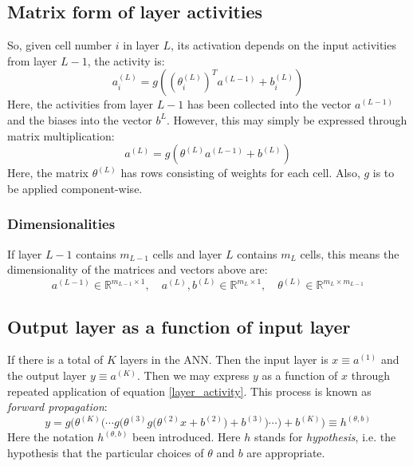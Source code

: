 \documentclass[12pt, a4paper]{article}
\numberwithin{equation}{section}
\begin{document}
\subsection{Matrix form of layer activities}
So, given cell number $i$ in layer $L$, its activation depends on the input activities from layer $L-1$, the activity is:
\begin{equation}
\label{layer_activity}
a^{(L)}_i=g\left(\left(\theta^{(L)}_i\right)^T a^{(L-1)} + b_i^{(L)}\right)
\end{equation}
Here, the activities from layer $L-1$ has been collected into the vector $a^{(L-1)}$ and the biases into the vector $b^{L}$. However, this may simply be expressed through matrix multiplication:
\begin{equation}
a^{(L)}=g\left(\theta^{(L)}a^{(L-1)}+b^{(L)}\right)
\end{equation}
Here, the matrix $\theta^{(L)}$ has rows consisting of weights for each cell. Also, $g$ is to be applied component-wise.

\subsubsection{Dimensionalities}
If layer $L-1$ contains $m_{L-1}$ cells and layer $L$ contains $m_L$ cells, this means the dimensionality of the matrices and vectors above are:
\begin{equation}
a^{(L-1)}\in\mathbb{R}^{m_{L-1}\times 1},\quad a^{(L)}, b^{(L)}\in\mathbb{R}^{m_L\times 1},\quad\theta^{(L)}\in\mathbb{R}^{m_L\times m_{L-1}} 
\end{equation}

\subsection{Output layer as a function of input layer}
If there is a total of $K$ layers in the ANN. Then the input layer is $x\equiv a^{(1)}$ and the output layer $y\equiv a^{(K)}$. Then we may express $y$ as a function of $x$ through repeated application of equation \ref{layer_activity}. This process is known as \textit{forward propagation}:
\begin{equation}
\label{hypothesis}
y=g\Bigg(\theta^{(K)}\bigg(\cdots g\Big(\theta^{(3)} g\big(\theta^{(2)}x+b^{(2)}\big)+b^{(3)}\Big)\cdots\bigg)+b^{(K)}\Bigg)\equiv h^{(\theta,b)}
\end{equation}
Here the notation $h^{(\theta,b)}$ been introduced. Here $h$ stands for \textit{hypothesis}, i.e. the hypothesis that the particular choices of $\theta$ and $b$ are appropriate.
\end{document}
